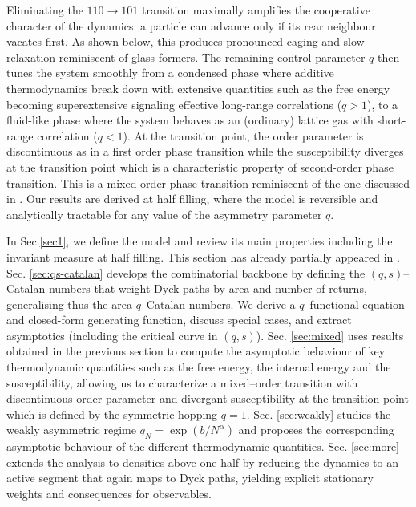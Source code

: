 \documentclass[pdflatex,sn-mathphys-num]{sn-jnl}
\theoremstyle{definition}
\theoremstyle{remark}
\numberwithin{equation}{section}
\begin{document}
Eliminating the \(110\!\to\!101\) transition maximally amplifies the cooperative character of the dynamics: a particle can advance only if its rear neighbour vacates first. As shown below, this produces pronounced caging and slow relaxation reminiscent of glass formers.  
The remaining control parameter \(q\) then tunes the system smoothly from a condensed phase where additive thermodynamics break down with extensive quantities such as the free energy becoming superextensive signaling effective long-range correlations ($q>1$), to a fluid-like phase where the system behaves as an (ordinary) lattice gas with short-range correlation ($q<1$).  At the transition point, the order parameter is
discontinuous as in a first order phase transition  while the susceptibility diverges at the transition point which is a characteristic property of second-order phase transition. This is a mixed order phase transition reminiscent of the one discussed in \cite{bar2014mixed}.
Our results are derived at half filling, where the model is reversible  and analytically tractable for any value of the asymmetry parameter $q$.

In Sec.\ref{sec1}, we define the model and review its main properties including the invariant measure at half filling. This section has already partially appeared in \cite{grosskinsky2025long}.
Sec. \ref{sec:qs-catalan}
develops the combinatorial backbone by defining the $(q,s)$–Catalan numbers that weight Dyck paths by area and number of returns, generalising thus the area $q$–Catalan numbers. We derive a $q$–functional equation and closed-form generating function, discuss special cases, and extract asymptotics (including the critical curve in $(q,s)$). Sec. \ref{sec:mixed} uses results obtained in the previous section to compute the asymptotic behaviour of key thermodynamic quantities such as the free energy, the internal energy and the susceptibility, allowing us to
characterize a mixed–order transition with discontinuous order parameter and divergant susceptibility at the transition point which is defined by the symmetric hopping $q=1$. 
Sec. \ref{sec:weakly} studies the weakly asymmetric regime $q_N=\exp(b/N^\alpha)$ and proposes the corresponding asymptotic behaviour of the different thermodynamic quantities.
Sec. \ref{sec:more} extends the analysis to densities above one half by reducing the dynamics to an active segment that again maps to Dyck paths, yielding explicit stationary weights and consequences for observables. 
\end{document}

